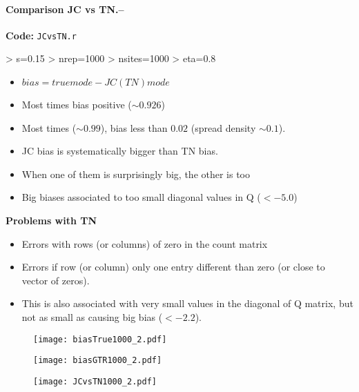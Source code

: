 \documentclass[12pt,letterpaper]{article}
\begin{document}
\paragraph{Comparison JC vs TN.--}
\textbf{Code:} \texttt{JCvsTN.r}

\begin{Schunk}
\begin{Sinput}
> s=0.15
> nrep=1000
> nsites=1000
> eta=0.8
\end{Sinput}
\end{Schunk}


\begin{itemize}
\item $bias=true mode - JC(TN) mode$
\item Most times bias positive ($\sim 0.926$)
\item Most times ($\sim 0.99$), bias less than $0.02$ (spread density $\sim 0.1$).
\item JC bias is systematically bigger than TN bias.
\item When one of them is surprisingly big, the other is too
\item Big biases associated to too small diagonal values in Q ($<-5.0$)
\end{itemize}

\textbf{Problems with TN}
\begin{itemize}
\item Errors with rows (or columns) of zero in the count matrix
\item Errors if row (or column) only one entry different than zero (or
  close to vector of zeros).
\item This is also associated with very small values in the diagonal
  of Q matrix, but not as small as causing big bias ($<-2.2$).
\end{itemize}

\begin{figure}
\centering
\texttt{[image: biasTrue1000\_2.pdf]}
\end{figure}

\begin{figure}
\centering
\texttt{[image: biasGTR1000\_2.pdf]}
\end{figure}

\begin{figure}
\centering
\texttt{[image: JCvsTN1000\_2.pdf]}
\end{figure}
\end{document}
